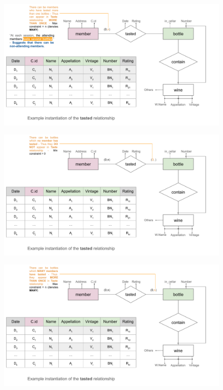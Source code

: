 \documentclass{beamer}
\begin{document}
\begin{frame}
    \begin{figure}
        \centering
        \includegraphics[width=1.1\linewidth]{tut_02_files/12.pdf}
    \end{figure}
\end{frame}

\begin{frame}
    \begin{figure}
        \centering
        \includegraphics[width=1.1\linewidth]{tut_02_files/13.pdf}
    \end{figure}
\end{frame}

\begin{frame}
    \begin{figure}
        \centering
        \includegraphics[width=1.1\linewidth]{tut_02_files/14.pdf}
    \end{figure}
\end{frame}
\end{document}
